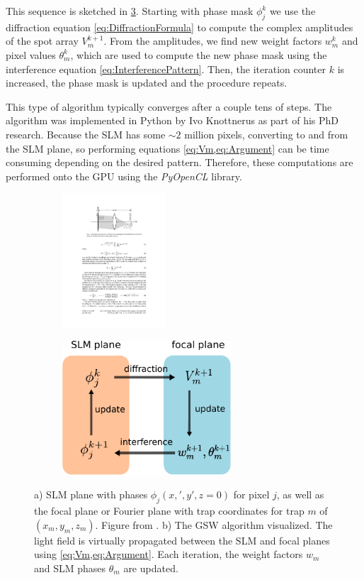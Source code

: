 This sequence is sketched in \cref{fig:GerschbergSaxton}. Starting with phase mask $\phi_j^k$ we use the diffraction equation \cref{eq:DiffractionFormula} to compute the complex amplitudes of the spot array $V_m^{k+1}$. From the amplitudes, we find new weight factors $w_m^k$ and pixel values $\theta_m^k$, which are used to compute the new phase mask using the interference equation \cref{eq:InterferencePattern}. Then, the iteration counter $k$ is increased, the phase mask is updated and the procedure repeats. 

This type of algorithm typically converges after a couple tens of steps. The algorithm was implemented in Python by Ivo Knottnerus as part of his PhD research. Because the SLM has some $\sim 2$ million pixels, converting to and from the SLM plane, so performing equations  \cref{eq:Vm,eq:Argument} can be time consuming depending on the desired pattern. Therefore, these computations are performed onto the GPU using the \textit{PyOpenCL} library. 

\begin{figure}
\centering
	\begin{subfigure}{.56\textwidth}
		\centering
		\includegraphics[height=5cm]{figures/SLMgeometry.pdf}
		\caption{}
		\label{fig:SLMgeometry}
	\end{subfigure}
	\begin{subfigure}{.43\textwidth}
		\centering
		\includegraphics[height=5cm]{figures/WeightedGerschbergSaxton.pdf}
		\caption{}
		\label{fig:MOTconcept}
	\end{subfigure}
	\caption{a) SLM plane with phases $\phi_j(x,',y',z=0)$ for pixel $j$, as well as the focal plane or Fourier plane with trap coordinates for trap $m$ of $(x_m,y_m,z_m)$. Figure from \cite{DiLeonardo2007}. b) The \ac{GSW} algorithm visualized. The light field is virtually propagated between the SLM and focal planes using \cref{eq:Vm,eq:Argument}. Each iteration, the weight factors $w_m$ and SLM phases $\theta_m$ are updated. }
	\label{fig:GerschbergSaxton}
\end{figure}


